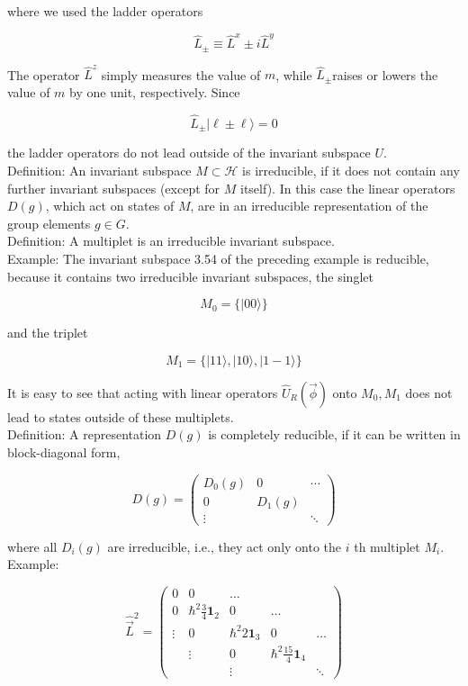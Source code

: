 \documentclass[10pt, letterpaper]{article}
\begin{document}
where we used the ladder operators

$$
\hat{L}_{ \pm} \equiv \hat{L}^{x} \pm i \hat{L}^{y}
$$

The operator $\hat{L}^{z}$ simply measures the value of $m$, while $\hat{L}_{ \pm}$raises or lowers the value of $m$ by one unit, respectively. Since

$$
\hat{L}_{ \pm}|\ell \pm \ell\rangle=0
$$

the ladder operators do not lead outside of the invariant subspace $U$.\\
Definition: An invariant subspace $M \subset \mathcal{H}$ is irreducible, if it does not contain any further invariant subspaces (except for $M$ itself). In this case the linear operators $D(g)$, which act on states of $M$, are in an irreducible representation of the group elements $g \in G$.\\
Definition: A multiplet is an irreducible invariant subspace.\\
Example: The invariant subspace 3.54 of the preceding example is reducible, because it contains two irreducible invariant subspaces, the singlet

$$
M_{0}=\{|00\rangle\}
$$

and the triplet

$$
M_{1}=\{|11\rangle,|10\rangle,|1-1\rangle\}
$$

It is easy to see that acting with linear operators $\hat{U}_{R}(\vec{\phi})$ onto $M_{0}, M_{1}$ does not lead to states outside of these multiplets.\\
Definition: A representation $D(g)$ is completely reducible, if it can be written in block-diagonal form,

$$
D(g)=\left(\begin{array}{ccc}
D_{0}(g) & 0 & \cdots \\
0 & D_{1}(g) & \\
\vdots & & \ddots
\end{array}\right)
$$

where all $D_{i}(g)$ are irreducible, i.e., they act only onto the $i$ th multiplet $M_{i}$.\\
Example:

$$
\hat{\vec{L}}^{2}=\left(\begin{array}{ccccc}
0 & 0 & \ldots & & \\
0 & \hbar^{2} \frac{3}{4} \mathbf{1}_{2} & 0 & \ldots & \\
\vdots & 0 & \hbar^{2} 2 \mathbf{1}_{3} & 0 & \ldots \\
& \vdots & 0 & \hbar^{2} \frac{15}{4} \mathbf{1}_{4} & \\
& & \vdots & & \ddots
\end{array}\right)
$$
\end{document}
